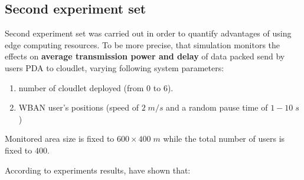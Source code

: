 \documentclass[sigchi]{acmart}
\begin{document}
\subsection{Second experiment set}

Second experiment set was carried out in order to quantify advantages of using edge computing resources. To be more precise, that simulation monitors the effects on \textbf{average transmission power and delay} of data packed send by users PDA to cloudlet, varying following system parameters:

\begin{enumerate}
\item number of cloudlet deployed (from 0 to 6).
\item WBAN user's positions (speed of $2\;m/s$ and a random pause time of $1-10\;s$)
\end{enumerate}

Monitored area size is fixed to $600 \times 400\;m$ while the total number of users is fixed to $400$.

According to experiments results, \cite{MSAReport} have shown that:
\end{document}
